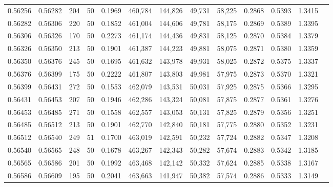\begin{tabular}{rrrrrrrrrrrrr}
0.56256 & 0.56282 &   204 &  50 &                                     0.1969 & 460,784 & 144,826 &  49,731 &  58,225 & 0.2868 & 0.5393 & 1.3415 \\
0.56282 & 0.56306 &   220 &  50 &                                     0.1852 & 461,004 & 144,606 &  49,781 &  58,175 & 0.2869 & 0.5389 & 1.3395 \\
0.56306 & 0.56326 &   170 &  50 &                                     0.2273 & 461,174 & 144,436 &  49,831 &  58,125 & 0.2870 & 0.5384 & 1.3379 \\
0.56326 & 0.56350 &   213 &  50 &                                     0.1901 & 461,387 & 144,223 &  49,881 &  58,075 & 0.2871 & 0.5380 & 1.3359 \\
0.56350 & 0.56376 &   245 &  50 &                                     0.1695 & 461,632 & 143,978 &  49,931 &  58,025 & 0.2872 & 0.5375 & 1.3337 \\
0.56376 & 0.56399 &   175 &  50 &                                     0.2222 & 461,807 & 143,803 &  49,981 &  57,975 & 0.2873 & 0.5370 & 1.3321 \\
0.56399 & 0.56431 &   272 &  50 &                                     0.1553 & 462,079 & 143,531 &  50,031 &  57,925 & 0.2875 & 0.5366 & 1.3295 \\
0.56431 & 0.56453 &   207 &  50 &                                     0.1946 & 462,286 & 143,324 &  50,081 &  57,875 & 0.2877 & 0.5361 & 1.3276 \\
0.56453 & 0.56485 &   271 &  50 &                                     0.1558 & 462,557 & 143,053 &  50,131 &  57,825 & 0.2879 & 0.5356 & 1.3251 \\
0.56485 & 0.56512 &   213 &  50 &                                     0.1901 & 462,770 & 142,840 &  50,181 &  57,775 & 0.2880 & 0.5352 & 1.3231 \\
0.56512 & 0.56540 &   249 &  51 &                                     0.1700 & 463,019 & 142,591 &  50,232 &  57,724 & 0.2882 & 0.5347 & 1.3208 \\
0.56540 & 0.56565 &   248 &  50 &                                     0.1678 & 463,267 & 142,343 &  50,282 &  57,674 & 0.2883 & 0.5342 & 1.3185 \\
0.56565 & 0.56586 &   201 &  50 &                                     0.1992 & 463,468 & 142,142 &  50,332 &  57,624 & 0.2885 & 0.5338 & 1.3167 \\
0.56586 & 0.56609 &   195 &  50 &                                     0.2041 & 463,663 & 141,947 &  50,382 &  57,574 & 0.2886 & 0.5333 & 1.3149 \\

\end{tabular}
